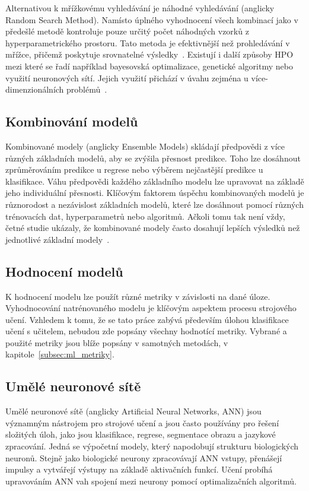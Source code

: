 Alternativou k mřížkovému vyhledávání je náhodné vyhledávání (anglicky Random
Search Method). Namísto úplného vyhodnocení všech kombinací jako v předešlé
metodě kontroluje pouze určitý počet náhodných vzorků z hyperparametrického
prostoru. Tato metoda je efektivnější než prohledávání v mřížce, přičemž
poskytuje srovnatelné
výsledky~\cite{anggoro2021,bergstra2012,Liashchynskyi2019}. Existují i další
způsoby HPO mezi které se řadí například bayesovská optimalizace, genetické
algoritmy nebo využití neuronových sítí. Jejich využití přichází v úvahu zejména
u více-dimenzionálních problémů~\cite{Alibrahim2021,Liashchynskyi2019}.

\subsection{Kombinování modelů}
Kombinované modely (anglicky Ensemble Models) skládají předpovědi z více různých
základních modelů, aby se zvýšila přesnost predikce. Toho lze dosáhnout
zprůměrováním predikce u regrese nebo výběrem nejčastější predikce u
klasifikace. Váhu předpovědi každého základního modelu lze upravovat na základě
jeho individuální přesnosti. Klíčovým faktorem úspěchu kombinovaných modelů je
různorodost a nezávislost základních modelů, které lze dosáhnout pomocí různých
trénovacích dat, hyperparametrů nebo algoritmů. Ačkoli tomu tak není vždy, četné
studie ukázaly, že kombinované modely často dosahují lepších výsledků než
jednotlivé základní modely~\cite{Parker2013}.

\subsection{Hodnocení modelů}
K hodnocení modelu lze použít různé metriky v závislosti na dané úloze.
Vyhodnocování natrénovaného modelu je klíčovým aspektem procesu strojového
učení. Vzhledem k tomu, že se tato práce zabývá především úlohou klasifikace
učení s učitelem, nebudou zde popsány všechny hodnotící metriky. Vybrané a
použité metriky jsou blíže popsány v samotných metodách, v
kapitole~\ref{subsec:ml_metriky}.

\subsection{Umělé neuronové sítě}
Umělé neuronové sítě (anglicky Artificial Neural Networks, \gls{ANN}) jsou
významným nástrojem pro strojové učení a jsou často používány pro řešení
složitých úloh, jako jsou klasifikace, regrese, segmentace obrazu a jazykové
zpracování. Jedná se výpočetní modely, který napodobují strukturu biologických
neuronů. Stejně jako biologické neurony zpracovávají \gls{ANN} vstupy, přenášejí
impulsy a vytvářejí výstupy na základě aktivačních funkcí. Učení probíhá
upravováním ANN vah spojení mezi neurony pomocí optimalizačních algoritmů.

